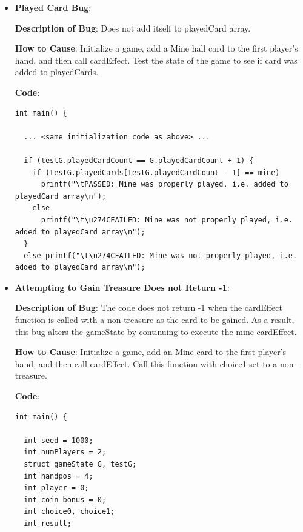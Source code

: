 \documentclass[11pt,letterpaper]{article}
\begin{document}
\begin{enumerate}[label=\Roman*.]
\begin{enumerate}
\begin{itemize}[leftmargin=*]
\begin{lstlisting}
  if (gCount == testGCount)
    printf("\tPASSED: Total card count is the same\n");
  else if (gCount < testGCount)
    printf("\t\u274CFAILED: Total card count of deck less than after card effect\n"); 
  else
    printf("\t\u274CFAILED: Total card count of deck greater than after card effect\n");
          \end{lstlisting}

        \item \textbf{Played Card Bug}:

        \textbf{Description of Bug}: Does not add itself to playedCard array.

        \textbf{How to Cause}: Initialize a game, add a Mine hall card to 
          the first player's hand, and then call cardEffect.
          Test the state of the game to see if card was added to playedCards.

        \textbf{Code}:

          \begin{lstlisting}
int main() {
  
  ... <same initialization code as above> ...

  if (testG.playedCardCount == G.playedCardCount + 1) {
    if (testG.playedCards[testG.playedCardCount - 1] == mine)
      printf("\tPASSED: Mine was properly played, i.e. added to playedCard array\n");
    else
      printf("\t\u274CFAILED: Mine was not properly played, i.e. added to playedCard array\n");
  } 
  else printf("\t\u274CFAILED: Mine was not properly played, i.e. added to playedCard array\n");
          \end{lstlisting}

        \item \textbf{Attempting to Gain Treasure Does not Return -1}:

        \textbf{Description of Bug}: The code does not return -1 when the
        cardEffect function is called with a non-treasure as the card to be
        gained. As a result, this bug alters the gameState by continuing
        to execute the mine cardEffect.

        \textbf{How to Cause}: Initialize a game, add an Mine card to 
          the first player's hand, and then call cardEffect.
          Call this function with choice1 set to a non-treasure.

        \textbf{Code}:

          \begin{lstlisting}
int main() {
  
  int seed = 1000;                      
  int numPlayers = 2;                   
  struct gameState G, testG;   
  int handpos = 4;                    
  int player = 0;                    
  int coin_bonus = 0;
  int choice0, choice1;  
  int result;            


\end{lstlisting}
\end{itemize}
\end{enumerate}
\end{enumerate}
\end{document}
